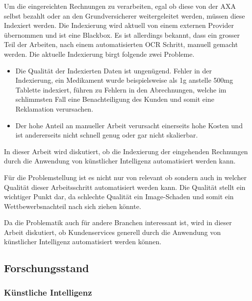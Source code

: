 \documentclass{hwz}
\begin{document}

Um die eingereichten Rechnungen zu verarbeiten, egal ob diese von der AXA selbst bezahlt oder an den Grundversicherer weitergeleitet werden, müssen diese Indexiert werden. Die Indexierung wird aktuell von einem externen Provider übernommen und ist eine Blackbox. Es ist allerdings bekannt, dass ein grosser Teil der Arbeiten, nach einem automatisierten OCR Schritt, manuell gemacht werden. Die aktuelle Indexierung birgt folgende zwei Probleme. 

\begin{itemize}
    \item Die Qualität der Indexierten Daten ist ungenügend. Fehler in der Indexierung, ein Medikament wurde beispielsweise als 1g anstelle 500mg Tablette indexiert, führen zu Fehlern in den Abrechnungen, welche im schlimmsten Fall eine Benachteiligung des Kunden und somit eine Reklamation verursachen. 
    \item Der hohe Anteil an manueller Arbeit verursacht einerseits hohe Kosten und ist andererseits nicht schnell genug oder gar nicht skalierbar.
\end{itemize}

In dieser Arbeit wird diskutiert, ob die Indexierung der eingehenden Rechnungen durch die Anwendung von künstlicher Intelligenz automatisiert werden kann.

Für die Problemstellung ist es nicht nur von relevant ob sondern auch in welcher Qualität dieser Arbeitsschritt automatisiert werden kann. Die Qualität stellt ein wichtiger Punkt dar, da schlechte Qualität ein Image-Schaden und somit ein Wettbewerbsnachteil nach sich ziehen könnte.

Da die Problematik auch für andere Branchen interessant ist, wird in dieser Arbeit diskutiert, ob Kundenservices generell durch die Anwendung von künstlicher Intelligenz automatisiert werden können.

\subsection{Forschungsstand}

\subsubsection{Künstliche Intelligenz}
\end{document}

